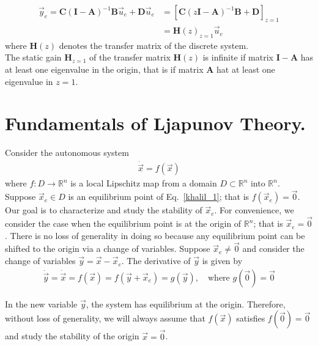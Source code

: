 \documentclass[11pt,a4paper,oneside]{book}
\numberwithin{equation}{section}
\theoremstyle{it}
\theoremstyle{definition}
\begin{document}
\begin{equation}\label{eq76}
	\begin{aligned}
		\vec{y}_e = \mathbf{C}\left( \mathbf{I} - \mathbf{A}\right)^{-1} 
		\mathbf{B}\vec{u}_e + {\mathbf{D}}\vec{u}_e &= \left[ {\mathbf{C}} 
		\left( z{\mathbf{I}}-{\mathbf{A}}\right)^{-1}{\mathbf{B}}+{\mathbf{D}} 
		\right]_{z=1} \\[8pt]
		&= {\mathbf{H}}(z)_{z=1}\vec{u}_e
	\end{aligned}
\end{equation}
where $\mathbf{H}(z)$ denotes the transfer matrix of the discrete system. \\
The static gain $\mathbf{H}_{z=1}$ of the transfer matrix $\mathbf{H}(z)$ is 
infinite if matrix $\mathbf{I}-\mathbf{A}$ has at least one eigenvalue in the 
origin, that is if matrix $\mathbf{A}$ hat at least one eigenvalue in $z=1$.

\section{Fundamentals of Ljapunov Theory.} 
Consider the autonomous system 
\begin{equation}\label{khalil_1}
	\begin{aligned}
		\dot{\vec{x}}=f(\vec{x})
	\end{aligned}
\end{equation}
where $f:D\rightarrow\mathbb{R}^n$ is a local Lipschitz map from a domain 
$D\subset\mathbb{R}^n$ into $\mathbb{R}^n$. Suppose $\vec{x}_e\in D$ is an 
equilibrium point of Eq.~\eqref{khalil_1}; that is $f(\vec{x}_e)=\vec{0}$. Our 
goal is to characterize and study the stability of $\vec{x}_e$. For 
convenience, we consider the case when the equilibrium point is at the origin 
of $\mathbb{R}^n$; that is $\vec{x}_e=\vec{0}$. There is no loss of generality 
in doing so because any equilibrium point can be shifted to the origin via a 
change of variables. Suppose $\vec{x}_e\ne\vec{0}$ and consider the change of 
variables $\vec{y} = \vec{x}-\vec{x}_e$. The derivative of $\vec{y}$ is given by
\begin{equation}\label{khalil_2}
	\begin{aligned}
		\dot{\vec{y}}= 
		\dot{\vec{x}}=f(\vec{x})=f(\vec{y}+\vec{x}_e)=g(\vec{y}),\quad\text{where
		 } g(\vec{0})=\vec{0}
	\end{aligned}
\end{equation}
\begin{mybox}
	In the new variable $\vec{y}$, the system has equilibrium at the origin. 
	Therefore, without loss of generality, we will always assume that 
	$f(\vec{x})$ satisfies $f(\vec{0})=\vec{0}$ and study the stability of the 
	origin $\vec{x}=\vec{0}$.
\end{mybox}
\end{document}
